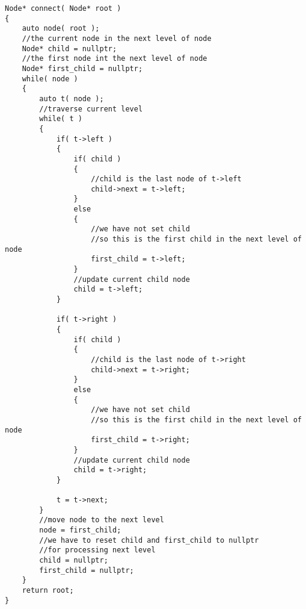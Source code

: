 \setcounter{lstlisting}{0}
\begin{lstlisting}[style=customc, caption={Level}]
Node* connect( Node* root )
{
    auto node( root );
    //the current node in the next level of node
    Node* child = nullptr;
    //the first node int the next level of node
    Node* first_child = nullptr;
    while( node )
    {
        auto t( node );
        //traverse current level
        while( t )
        {
            if( t->left )
            {
                if( child )
                {
                    //child is the last node of t->left
                    child->next = t->left;
                }
                else
                {
                    //we have not set child
                    //so this is the first child in the next level of node
                    first_child = t->left;
                }
                //update current child node
                child = t->left;
            }

            if( t->right )
            {
                if( child )
                {
                    //child is the last node of t->right
                    child->next = t->right;
                }
                else
                {
                    //we have not set child
                    //so this is the first child in the next level of node
                    first_child = t->right;
                }
                //update current child node
                child = t->right;
            }

            t = t->next;
        }
        //move node to the next level
        node = first_child;
        //we have to reset child and first_child to nullptr
        //for processing next level
        child = nullptr;
        first_child = nullptr;
    }
    return root;
}
\end{lstlisting}